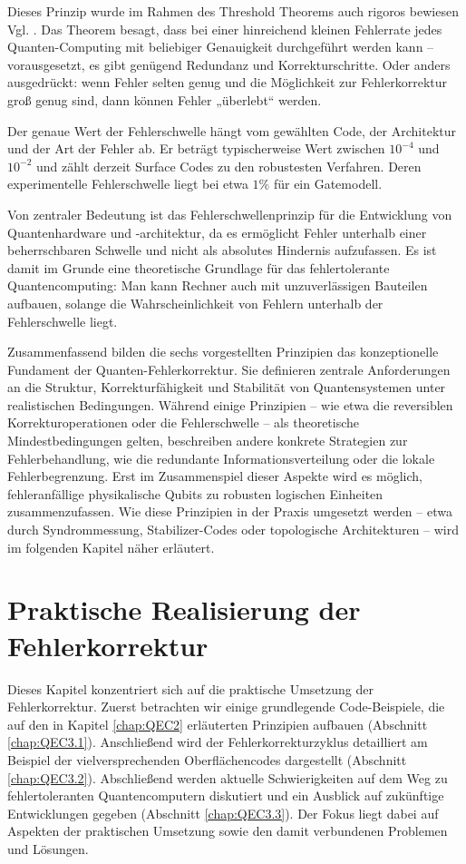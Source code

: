 Dieses Prinzip wurde im Rahmen des Threshold Theorems auch rigoros bewiesen Vgl. \cite{aharonov_fault-tolerant_1997}. Das Theorem besagt, dass bei einer hinreichend kleinen Fehlerrate jedes Quanten-Computing mit beliebiger Genauigkeit durchgeführt werden kann – vorausgesetzt, es gibt genügend Redundanz und Korrekturschritte. Oder anders ausgedrückt: wenn Fehler selten genug und die Möglichkeit zur Fehlerkorrektur groß genug sind, dann können Fehler „überlebt“ werden.

Der genaue Wert der Fehlerschwelle hängt vom gewählten Code, der Architektur und der Art der Fehler ab. Er beträgt typischerweise  Wert zwischen \(
    10^{-4}
\)  und \(
    10^{-2}
\) und zählt derzeit Surface Codes zu den robustesten Verfahren. Deren experimentelle Fehlerschwelle liegt bei etwa \(1 \%\) für 
ein Gatemodell. \cite{fowler_surface_2012}

Von zentraler Bedeutung ist das Fehlerschwellenprinzip für die Entwicklung von Quantenhardware und -architektur, da es ermöglicht Fehler unterhalb einer beherrschbaren Schwelle und nicht als absolutes Hindernis aufzufassen. Es ist damit im Grunde eine theoretische Grundlage für das fehlertolerante Quantencomputing: Man kann Rechner auch mit unzuverlässigen Bauteilen aufbauen, solange die Wahrscheinlichkeit von Fehlern unterhalb der Fehlerschwelle liegt.

Zusammenfassend bilden die sechs vorgestellten Prinzipien das konzeptionelle Fundament der Quanten-Fehlerkorrektur. Sie definieren zentrale Anforderungen an die Struktur, Korrekturfähigkeit und Stabilität von Quantensystemen unter realistischen Bedingungen. Während einige Prinzipien – wie etwa die reversiblen Korrekturoperationen oder die Fehlerschwelle – als theoretische Mindestbedingungen gelten, beschreiben andere konkrete Strategien zur Fehlerbehandlung, wie die redundante Informationsverteilung oder die lokale Fehlerbegrenzung. Erst im Zusammenspiel dieser Aspekte wird es möglich, fehleranfällige physikalische Qubits zu robusten logischen Einheiten zusammenzufassen. Wie diese Prinzipien in der Praxis umgesetzt werden – etwa durch Syndrommessung, Stabilizer-Codes oder topologische Architekturen – wird im folgenden Kapitel näher erläutert.

\section{Praktische Realisierung der Fehlerkorrektur}\label{chap:QEC3}

Dieses Kapitel konzentriert sich auf die praktische Umsetzung der Fehlerkorrektur.
Zuerst betrachten wir einige grundlegende Code-Beispiele, die auf den in Kapitel \ref{chap:QEC2} erläuterten Prinzipien aufbauen (Abschnitt \ref{chap:QEC3.1}). Anschließend wird der Fehlerkorrekturzyklus detailliert am Beispiel der vielversprechenden Oberflächencodes dargestellt (Abschnitt \ref{chap:QEC3.2}). Abschließend werden aktuelle Schwierigkeiten auf dem Weg zu fehlertoleranten Quantencomputern diskutiert und ein Ausblick auf zukünftige Entwicklungen gegeben (Abschnitt \ref{chap:QEC3.3}). Der Fokus liegt dabei auf Aspekten der praktischen Umsetzung sowie den damit verbundenen Problemen und Lösungen.

